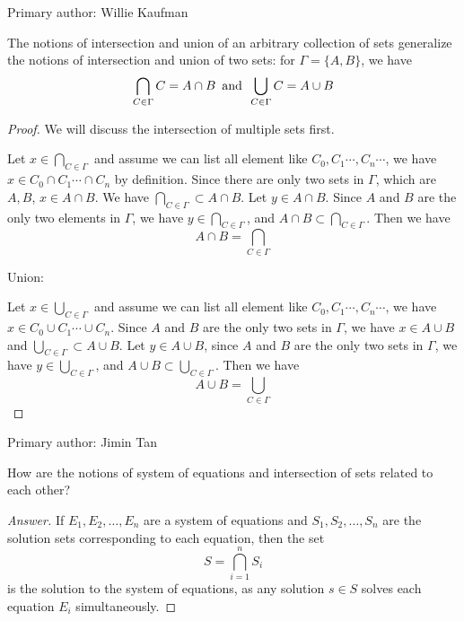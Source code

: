             Primary author: Willie Kaufman

\begin{majorEx}%
    The notions of intersection and union of an arbitrary collection of sets
    generalize the notions of intersection and union of two sets: for $\Gamma =
    \{A, B\}$, we have 
    $$
    \bigcap_{C \in \Gamma} C = A \cap B \hspace{5pt} \text{\normalfont and}
    \hspace{5pt} \bigcup_{C \in \Gamma} C = A \cup B
    $$
\end{majorEx}

\begin{proof}
            
            We will discuss the intersection of multiple sets first.
            
            Let $x \in \bigcap_{C \in \Gamma}$ and assume we can list all element like $C_0, C_1 \cdots, C_n \cdots$, we have $x \in C_0 \cap C_1 \cdots \cap C_n$ by definition. Since there are only two sets in $\Gamma$, which are $A, B$, $x \in A \cap B$. We have $\bigcap_{C \in \Gamma} \subset A \cap B$. Let $y \in A \cap B$. Since $A$ and $B$ are the only two elements in $\Gamma$, we have $y \in \bigcap_{C \in \Gamma}$, and $A \cap B \subset \bigcap_{C \in \Gamma}$. Then we have $$A \cap B = \bigcap_{C \in \Gamma}$$
            
            Union:
            
            Let $x \in \bigcup_{C \in \Gamma}$ and assume we can list all element like $C_0, C_1 \cdots, C_n \cdots$, we have $x \in C_0 \cup C_1 \cdots \cup C_n$. Since $A$ and $B$ are the only two sets in $\Gamma$, we have $x \in A \cup B$ and $\bigcup_{C \in \Gamma} \subset A \cup B$. Let $y \in A \cup B$, since $A$ and $B$ are the only two sets in $\Gamma$, we have $y \in \bigcup_{C \in \Gamma}$, and $A \cup B \subset \bigcup_{C \in \Gamma}$. Then we have $$A \cup B = \bigcup_{C \in \Gamma}$$
            \end{proof}
                    Primary author: Jimin Tan


\begin{minorEx}%
    [Riddle]
    How are the notions of system of equations and intersection of sets related
    to each other?
\end{minorEx}

\begin{proof}
    [Answer]
    If $E_1, E_2, \ldots, E_n$ are a system of equations and $S_1, S_2, \ldots,
    S_n$ are the solution sets corresponding to each equation, then the set
    \[
        S = \bigcap_{i=1}^{n} S_i
    \]
    is the solution to the system of equations, as any solution $s \in S$ solves
    each equation $E_i$ simultaneously.
\end{proof}

